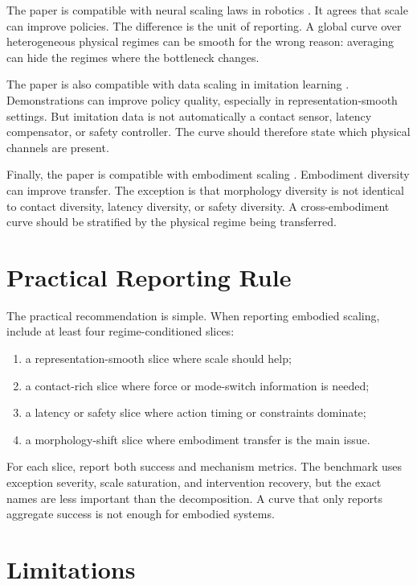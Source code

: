 \documentclass{article}
\begin{document}
The paper is compatible with neural scaling laws in robotics \citep{neural_scaling_robotics}. It agrees that scale can improve policies. The difference is the unit of reporting. A global curve over heterogeneous physical regimes can be smooth for the wrong reason: averaging can hide the regimes where the bottleneck changes.

The paper is also compatible with data scaling in imitation learning \citep{data_scaling_il}. Demonstrations can improve policy quality, especially in representation-smooth settings. But imitation data is not automatically a contact sensor, latency compensator, or safety controller. The curve should therefore state which physical channels are present.

Finally, the paper is compatible with embodiment scaling \citep{embodiment_scaling_locomotion}. Embodiment diversity can improve transfer. The exception is that morphology diversity is not identical to contact diversity, latency diversity, or safety diversity. A cross-embodiment curve should be stratified by the physical regime being transferred.

\section{Practical Reporting Rule}

The practical recommendation is simple. When reporting embodied scaling, include at least four regime-conditioned slices:

\begin{enumerate}
    \item a representation-smooth slice where scale should help;
    \item a contact-rich slice where force or mode-switch information is needed;
    \item a latency or safety slice where action timing or constraints dominate;
    \item a morphology-shift slice where embodiment transfer is the main issue.
\end{enumerate}

For each slice, report both success and mechanism metrics. The benchmark uses exception severity, scale saturation, and intervention recovery, but the exact names are less important than the decomposition. A curve that only reports aggregate success is not enough for embodied systems.

\section{Limitations}
\end{document}
